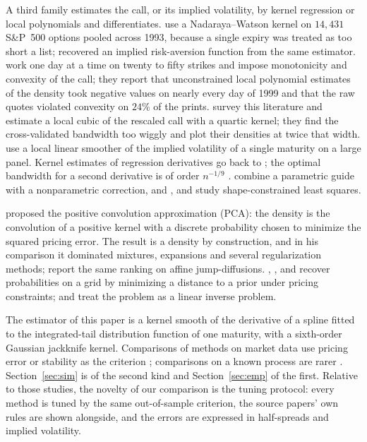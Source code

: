 \documentclass[preprint,12pt,authoryear,times]{elsarticle}
\begin{document}
A third family estimates the call, or its implied volatility, by kernel regression or local polynomials and differentiates. \citet{aitsahalia1998} use a Nadaraya--Watson kernel on \(14{,}431\) S\&P~500 options pooled across 1993, because a single expiry was treated as too short a list; \citet{aitsahalia2000} recovered an implied risk-aversion function from the same estimator. \citet{aitsahalia2003} work one day at a time on twenty to fifty strikes and impose monotonicity and convexity of the call; they report that unconstrained local polynomial estimates of the density took negative values on nearly every day of 1999 and that the raw quotes violated convexity on \(24\%\) of the prints. \citet{grith2012} survey this literature and estimate a local cubic of the rescaled call with a quartic kernel; they find the cross-validated bandwidth too wiggly and plot their densities at twice that width. \citet{songxiu2016} use a local linear smoother of the implied volatility of a single maturity on a large panel. Kernel estimates of regression derivatives go back to \citet{gassermuller1984}; the optimal bandwidth for a second derivative is of order \(n^{-1/9}\) \citep{fangijbels1996}. \citet{fanmancini2009} combine a parametric guide with a nonparametric correction, and \citet{yatchew2006}, \citet{birke2009} and \citet{monteiro2008} study shape-constrained least squares.

\citet{bondarenko2003} proposed the positive convolution approximation (PCA): the density is the convolution of a positive kernel with a discrete probability chosen to minimize the squared pricing error. The result is a density by construction, and in his comparison it dominated mixtures, expansions and several regularization methods; \citet{lu2019} report the same ranking on affine jump-diffusions. \citet{rubinstein1994}, \citet{jackwerth1996}, \citet{stutzer1996} and \citet{buchen1996} recover probabilities on a grid by minimizing a distance to a prior under pricing constraints; \citet{cont2004} and \citet{monnier2014} treat the problem as a linear inverse problem.

The estimator of this paper is a kernel smooth of the derivative of a spline fitted to the integrated-tail distribution function of one maturity, with a sixth-order Gaussian jackknife kernel. Comparisons of methods on market data use pricing error or stability as the criterion \citep{cooper1999,jondeau2000,coutant2001,anagnou2005,bliss2002,liu2007}; comparisons on a known process are rarer \citep{bondarenko2003,lai2014,santos2015,lu2019}. Section~\ref{sec:sim} is of the second kind and Section~\ref{sec:emp} of the first. Relative to those studies, the novelty of our comparison is the tuning protocol: every method is tuned by the same out-of-sample criterion, the source papers' own rules are shown alongside, and the errors are expressed in half-spreads and implied volatility.
\end{document}
